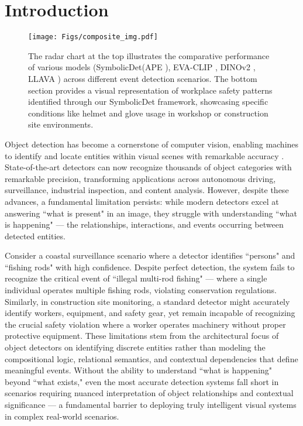 \section{Introduction}
\label{sec:intro}
% 
\begin{figure}[!t]
    \centering
    \setlength{\abovecaptionskip}{0cm}
    \texttt{[image: Figs/composite\_img.pdf]}
    \caption{The radar chart at the top illustrates the comparative performance of various models (SymbolicDet(APE \cite{shen2024aligning}), EVA-CLIP \cite{sun2023eva}, DINOv2 \cite{oquab2023dinov2}, LLAVA \cite{liu2023visual}) across different event detection scenarios. The bottom section provides a visual representation of workplace safety patterns identified through our SymbolicDet framework, showcasing specific conditions like helmet and glove usage in workshop or construction site environments.}
    \label{fig:composite}
    \vspace{-0.5cm}
\end{figure}
% 
Object detection has become a cornerstone of computer vision, enabling machines to identify and locate entities within visual scenes with remarkable accuracy \cite{girshick2014rich, girshick2015fast, ren2015faster, redmon2016you,cai2018cascade,carion2020end,zhu2020deformable,zhang2022dino,jia2023detrs,liu2022dab,meng2021conditional}. State-of-the-art detectors can now recognize thousands of object categories with remarkable precision, transforming applications across autonomous driving, surveillance, industrial inspection, and content analysis. However, despite these advances, a fundamental limitation persists: while modern detectors excel at answering ``what is present" in an image, they struggle with understanding ``what is happening" --- the relationships, interactions, and events occurring between detected entities. \par
% 
Consider a coastal surveillance scenario where a detector identifies ``persons" and ``fishing rods" with high confidence. Despite perfect detection, the system fails to recognize the critical event of ``illegal multi-rod fishing" --- where a single individual operates multiple fishing rods, violating conservation regulations. Similarly, in construction site monitoring, a standard detector might accurately identify workers, equipment, and safety gear, yet remain incapable of recognizing the crucial safety violation where a worker operates machinery without proper protective equipment.
%
These limitations stem from the architectural focus of object detectors on identifying discrete entities rather than modeling the compositional logic, relational semantics, and contextual dependencies that define meaningful events. Without the ability to understand ``what is happening" beyond ``what exists," even the most accurate detection systems fall short in scenarios requiring nuanced interpretation of object relationships and contextual significance --- a fundamental barrier to deploying truly intelligent visual systems in complex real-world scenarios. \par
